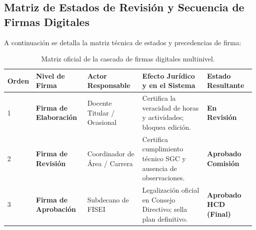 \documentclass[12pt,a4paper]{article}
\begin{document}
\subsection{Matriz de Estados de Revisión y Secuencia de Firmas Digitales}
A continuación se detalla la matriz técnica de estados y precedencias de firma:
\begin{table}[H]
\centering
\small
\renewcommand{\arraystretch}{1.2}
\begin{tabularx}{\textwidth}{|>{\hsize=0.3\hsize\centering\arraybackslash\footnotesize}X|>{\hsize=0.8\hsize\raggedright\arraybackslash\bfseries\footnotesize}X|>{\hsize=0.9\hsize\raggedright\arraybackslash\footnotesize}X|>{\hsize=1.3\hsize\raggedright\arraybackslash\footnotesize}X|>{\hsize=0.7\hsize\centering\arraybackslash\footnotesize}X|}
\hline
\rowcolor{tableheader}
\textbf{Orden} & \textbf{Nivel de Firma} & \textbf{Actor Responsable} & \textbf{Efecto Jurídico y en el Sistema} & \textbf{Estado Resultante} \\
\hline
1 & Firma de Elaboración & Docente Titular / Ocasional & Certifica la veracidad de horas y actividades; bloquea edición. & \textbf{En Revisión} \\
\hline
2 & Firma de Revisión & Coordinador de Área / Carrera & Certifica cumplimiento técnico SGC y ausencia de observaciones. & \textbf{Aprobado Comisión} \\
\hline
3 & Firma de Aprobación & Subdecano de FISEI & Legalización oficial en Consejo Directivo; sella plan definitivo. & \textbf{Aprobado HCD (Final)} \\
\hline
\end{tabularx}
\caption{Matriz oficial de la cascada de firmas digitales multinivel.}
\label{tab:firmas_matrix}
\end{table}
\end{document}
